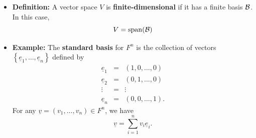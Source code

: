 \documentclass[11pt,twoside]{report}
\newcommand{\bbN}{{\mathbb{N}}}
\newcommand{\vecnot}{\underline}
\newcommand{\Span}{\mathrm{span}}
\begin{document}
\begin{itemize}
\begin{enumerate}[(i)]
\item  $\cB$ is linearly independent, and
\item  every $\vecnot{v} \in V$ can be written as a \emph{finite} linear combination of vectors from $\mathcal{B}$, i.e., 
\[
\forall \vecnot{v} \in V, \, \exists n \in \bbN, \, \alpha_1, \dots, \alpha_n \in A, s_1, \dots s_n \in F  \quad \text{such that}  \quad \vecnot{v} = \sum_{i=1}^n s_i \vecnot{v}_{\alpha_{i}} 
\]
\end{enumerate}
[Here, the indexing of the basis elements with  $\alpha \in A$ indicates that the set maybe finite, countably infinite, or uncountably infinite].








\item \textbf{Definition:} A vector space $V$ is \textbf{finite-dimensional} if it has a finite basis $\cB$. In this case, 
\[
V = \Span(\cB) 
\]



\item \textbf{Example:}  The \textbf{standard basis} for $F^n$ is the collection of vectors  $\left\{ \vecnot{e}_1, \ldots, \vecnot{e}_n \right\}$ defined by
\begin{equation*}
\begin{array}{ccc}
\vecnot{e}_1 & = & (1, 0, \ldots, 0) \\
\vecnot{e}_2 & = & (0, 1, \ldots, 0) \\
\vdots & = & \vdots \\
\vecnot{e}_n & = & (0, 0, \ldots, 1).
\end{array}
\end{equation*}
For any $\vecnot{v} = (v_1, \ldots, v_n) \in F^n$, we have
\begin{equation*} %
\vecnot{v} = \sum_{i=1}^n v_i \vecnot{e}_i.
\end{equation*}




\end{itemize}
\end{document}
